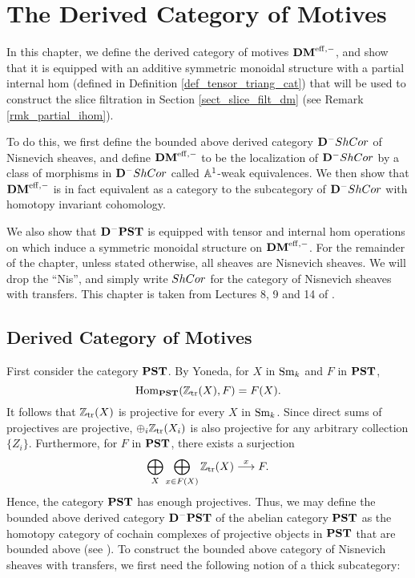 \newpage
\chapter{The Derived Category of Motives}\label{sect_dmeff_and_dm}

In this chapter, we define the derived category of motives $\DMeff$,
and show that it is equipped with an additive symmetric monoidal 
structure with a partial internal hom (defined in Definition
\ref{def_tensor_triang_cat}) that will be used to construct the 
slice filtration in Section \ref{sect_slice_filt_dm} (see Remark 
\ref{rmk_partial_ihom}).

To do this, we first define the bounded above derived category 
$\DCat^-\ShCor$ of Nisnevich sheaves, and define $\DMeff$ to be
the localization of $\DCat^-\ShCor$ by a class of morphisms in
$\DCat^-\ShCor$ called $\A^1$-weak equivalences. We then show that
$\DMeff$ is in fact equivalent as a category to the subcategory
of $\DCat^-\ShCor$ with homotopy invariant cohomology. 

We also show that $\DCat^-\PST$ is equipped with tensor and 
internal hom operations on which induce a symmetric monoidal 
structure on $\DMeff$. For the remainder of the chapter, unless 
stated otherwise, all sheaves are Nisnevich sheaves. We will drop 
the ``Nis'', and simply write $\ShCor$ for the category of 
Nisnevich sheaves with transfers. This chapter is taken from
Lectures 8, 9 and 14 of \cite{MVW}.

\section{Derived Category of Motives}

First consider the category $\PST$. By Yoneda, for $X$ in $\Sm$ and
$F$ in $\PST$,
\[
\hom_{\PST}(\Ztr(X), F) = F(X).
\]
It follows that $\Ztr(X)$ is projective for every $X$ in $\Sm$.
Since direct sums of projectives are projective, 
$\oplus_i \Ztr(X_i)$ is also projective for any arbitrary 
collection $\{Z_i\}$. Furthermore, for $F$ in $\PST$, there exists 
a surjection
\begin{equation}\label{eq_res_by_rep}
\bigoplus_{X} \bigoplus_{x \in F(X)} \Ztr(X) 
   \stackrel{x}{\to} F.
\end{equation}
Hence, the category $\PST$ has enough projectives. Thus, we may define
the bounded above derived category $\DCat[D]^-\PST$ of the abelian
category $\PST$ as the homotopy category of cochain complexes of
projective objects in $\PST$ that are bounded above
(see
\cite[10.4.8]{WH}). To construct the bounded above category
of Nisnevich sheaves with transfers, we first need the following
notion of a thick subcategory:

